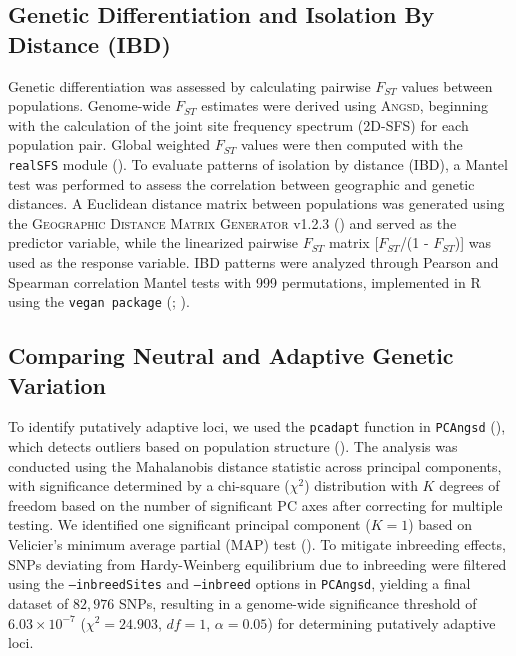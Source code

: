 \documentclass[9pt,a4paper,twoside]{rho-class/rho}
\begin{document}
    \subsection{Genetic Differentiation and Isolation By Distance (IBD)}

        Genetic differentiation was assessed by calculating pairwise $F_{ST}$ values between populations. Genome-wide $F_{ST}$ estimates were derived using \textsc{Angsd}, beginning with the calculation of the joint site frequency spectrum (2D-SFS) for each population pair. Global weighted $F_{ST}$ values were then computed with the \texttt{realSFS} module (\cite{Nielsen2012}). To evaluate patterns of isolation by distance (IBD), a Mantel test was performed to assess the correlation between geographic and genetic distances. A Euclidean distance matrix between populations was generated using the \textsc{Geographic Distance Matrix Generator} v1.2.3 (\Cite{Ersts2024}) and served as the predictor variable, while the linearized pairwise $F_{ST}$ matrix [$F_{ST}$/(1 - $F_{ST}$)] was used as the response variable. IBD patterns were analyzed through Pearson and Spearman correlation Mantel tests with 999 permutations, implemented in R using the \texttt{vegan package} (\cite{Oksanen2001}; \cite{Mantel1967}).
 
    \subsection{Comparing Neutral and Adaptive Genetic Variation}

        To identify putatively adaptive loci, we used the \texttt{pcadapt} function in \texttt{PCAngsd} (\cite{Meisner2018}), which detects outliers based on population structure (\cite{Luu2017}). The analysis was conducted using the Mahalanobis distance statistic across principal components, with significance determined by a chi-square ($\chi^2$) distribution with $K$ degrees of freedom based on the number of significant PC axes after correcting for multiple testing. We identified one significant principal component ($K = 1$) based on Velicier’s minimum average partial (MAP) test (\cite{Shriner2011}). To mitigate inbreeding effects, SNPs deviating from Hardy-Weinberg equilibrium due to inbreeding were filtered using the \texttt{--inbreedSites} and \texttt{--inbreed} options in \texttt{PCAngsd}, yielding a final dataset of $82,976$ SNPs, resulting in a genome-wide significance threshold of $6.03 \times 10^{-7}$ ($\chi^2 = 24.903$, $df = 1$, $\alpha = 0.05$) for determining putatively adaptive loci.
\end{document}
